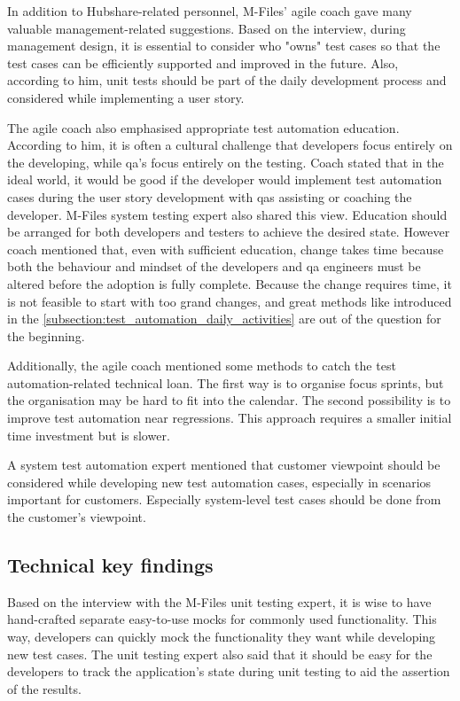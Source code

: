 In addition to Hubshare-related personnel, M-Files' agile coach gave many valuable management-related suggestions. Based on the interview, during management design, it is essential to consider who "owns" test cases so that the test cases can be efficiently supported and improved in the future. Also, according to him, unit tests should be part of the daily development process and considered while implementing a user story.

The agile coach also emphasised appropriate test automation education. According to him, it is often a cultural challenge that developers focus entirely on the developing, while \gls{qa}'s focus entirely on the testing. Coach stated that in the ideal world, it would be good if the developer would implement test automation cases during the user story development with \glspl{qa} assisting or coaching the developer. M-Files system testing expert also shared this view. Education should be arranged for both developers and testers to achieve the desired state. However coach mentioned that, even with sufficient education, change takes time because both the behaviour and mindset of the developers and \gls{qa} engineers must be altered before the adoption is fully complete. Because the change requires time, it is not feasible to start with too grand changes, and great methods like  introduced in the \autoref{subsection:test_automation_daily_activities} are out of the question for the beginning.

Additionally, the agile coach mentioned some methods to catch the test automation-related technical loan. The first way is to organise focus sprints, but the organisation may be hard to fit into the calendar. The second possibility is to improve test automation near regressions. This approach requires a smaller initial time investment but is slower.

A system test automation expert mentioned that customer viewpoint should be considered while developing new test automation cases, especially in scenarios important for customers. Especially system-level test cases should be done from the customer's viewpoint.

\subsection{Technical key findings}
Based on the interview with the M-Files unit testing expert, it is wise to have hand-crafted separate easy-to-use mocks for commonly used functionality. This way, developers can quickly mock the functionality they want while developing new test cases. The unit testing expert also said that it should be easy for the developers to track the application's state during unit testing to aid the assertion of the results.

